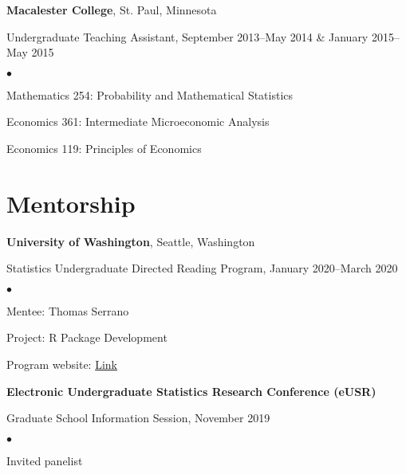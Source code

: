\documentclass[margin,centered]{res}
\newenvironment{list1}{
  \begin{list}{\ding{113}}{%
      \setlength{\itemsep}{0in}
      \setlength{\parsep}{0in} \setlength{\parskip}{0in}
      \setlength{\topsep}{0in} \setlength{\partopsep}{0in}
      \setlength{\leftmargin}{0.17in}}}{\end{list}}
\newenvironment{list2}{
  \begin{list}{$\bullet$}{%
      \setlength{\itemsep}{0in}
      \setlength{\parsep}{0in} \setlength{\parskip}{0in}
      \setlength{\topsep}{0in} \setlength{\partopsep}{0in}
      \setlength{\leftmargin}{0.2in}}}{\end{list}}
\begin{document}
\begin{resume}
{\bf Macalester College}, St. Paul, Minnesota
\begin{list1}
\item[] Undergraduate Teaching Assistant, September 2013--May 2014 \& January 2015--May 2015
\begin{list2}
\vspace*{.05in}
\item Mathematics 254: Probability and Mathematical Statistics
\item Economics 361: Intermediate Microeconomic Analysis
\item Economics 119: Principles of Economics
\end{list2}
\end{list1}


\section{\sc Mentorship}

{\bf University of Washington}, Seattle, Washington
\begin{list1}
\item[] Statistics Undergraduate Directed Reading Program, January 2020--March 2020
\begin{list2}
\vspace*{.05in}
\item Mentee: Thomas Serrano
\item Project: R Package Development
\item Program website: \href{https://spa-drp.github.io}{Link}
\end{list2}
\end{list1}

{\bf Electronic Undergraduate Statistics Research Conference (eUSR)}
\begin{list1}
\item[] Graduate School Information Session, November 2019
\begin{list2}
\vspace*{.05in}
\item Invited panelist
\end{list2}
\end{list1}




\end{resume}
\end{document}
